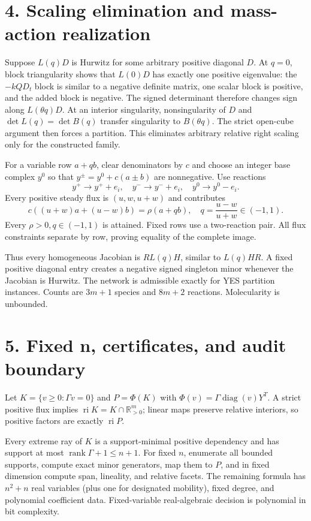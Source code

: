 \documentclass[10pt]{article}
\newcommand{\diag}{\operatorname{diag}}
\newcommand{\R}{\mathbb R}
\begin{document}
\newpage
\section*{4. Scaling elimination and mass-action realization}
Suppose $L(q)D$ is Hurwitz for some arbitrary positive diagonal $D$.  At
$q=0$, block triangularity shows that $L(0)D$ has exactly one positive
eigenvalue: the $-kQD_t$ block is similar to a negative definite matrix, one
scalar block is positive, and the added block is negative.  The signed
determinant therefore changes sign along $L(\theta q)D$.  At an interior
singularity, nonsingularity of $D$ and
$\det L(q)=\det B(q)$ transfer singularity to $B(\theta q)$.  The strict
open-cube argument then forces a partition.  This eliminates arbitrary
relative right scaling only for the constructed family.

For a variable row $a+qb$, clear denominators by $c$ and choose an integer base
complex $y^0$ so that $y^\pm=y^0+c(a\pm b)$ are nonnegative.  Use reactions
\[
 y^+\to y^++e_i,
 \quad y^-\to y^-+e_i,
 \quad y^0\to y^0-e_i.
\]
Every positive steady flux is $(u,w,u+w)$ and contributes
\[
 c((u+w)a+(u-w)b)=\rho(a+qb),
 \quad q=\frac{u-w}{u+w}\in(-1,1).
\]
Every $\rho>0,q\in(-1,1)$ is attained.  Fixed rows use a two-reaction pair.
All flux constraints separate by row, proving equality of the complete image.

Thus every homogeneous Jacobian is $RL(q)H$, similar to $L(q)HR$.  A fixed
positive diagonal entry creates a negative signed singleton minor whenever
the Jacobian is Hurwitz.  The network is admissible exactly for YES partition
instances.  Counts are $3m+1$ species and $8m+2$ reactions.  Molecularity is
unbounded.

\newpage
\section*{5. Fixed n, certificates, and audit boundary}
Let $K=\{v\geq0:\Gamma v=0\}$ and $P=\Phi(K)$ with
$\Phi(v)=\Gamma\diag(v)Y^T$.  A strict positive flux implies
$\operatorname{ri}K=K\cap\R_{>0}^m$; linear maps preserve relative interiors,
so positive factors are exactly $\operatorname{ri}P$.

Every extreme ray of $K$ is a support-minimal positive dependency and has
support at most $\operatorname{rank}\Gamma+1\leq n+1$.  For fixed $n$, enumerate
all bounded supports, compute exact minor generators, map them to $P$, and in
fixed dimension compute span, lineality, and relative facets.  The remaining
formula has $n^2+n$ real variables (plus one for designated mobility), fixed
degree, and polynomial coefficient data.  Fixed-variable real-algebraic
decision is polynomial in bit complexity.
\end{document}
